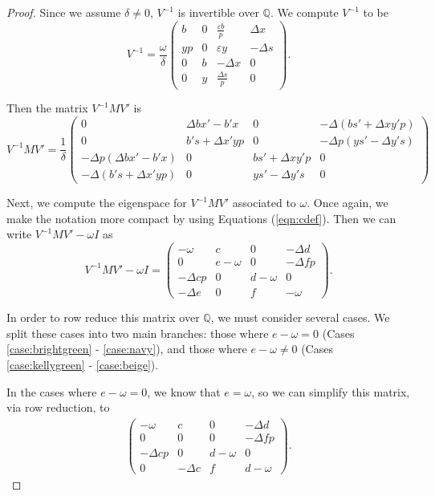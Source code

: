 \documentclass{amsart}     %
\theoremstyle{definition}
\begin{document}
\begin{proof}
Since we assume $\delta \neq 0$, $V^{-1}$ is invertible over $\mathbb{Q}$. We compute $V^{-1}$ to be 
%
\[V^{-1} =  \frac{\omega }{\delta} \begin{pmatrix} b & 0 & \frac{\varepsilon b}{p} & \Delta x\\
yp& 0 & \varepsilon y & -\Delta s\\ 0 & b & -\Delta x  & 0 \\ 
0 & y &  \frac{\Delta s}{p} & 0 \end{pmatrix}.\]

Then the matrix $V^{-1} M V' $ is 
%
\[V^{-1}M V' =  \frac{1}{\delta} \begin{pmatrix} 0 & \Delta b x' - b' x & 0 &  -\Delta( b s' + \Delta xy' p) \\
 0& b' s + \Delta x' y p & 0 & -\Delta p ( y s' - \Delta y' s)\\ 
-\Delta p( \Delta bx' -  b' x) & 0 & bs' + \Delta xy' p  & 0 \\ 
-\Delta( b's + \Delta x' y p) & 0 & ys' - \Delta y' s & 0 \end{pmatrix}\]

Next, we compute the eigenspace for $V^{-1} M V' $ associated to $\omega $. Once again, we make the notation more compact by using Equations (\ref{eqn:cdef}). Then we can write $V^{-1} M V'  - \omega  I$  as 
%
\[V^{-1}M V' - \omega  I =  \begin{pmatrix} -\omega  & c & 0 &  -\Delta d \\
 0& e - \omega  & 0 & -\Delta f p\\ 
-\Delta cp & 0 & d - \omega   & 0 \\ 
-\Delta e & 0 & f &  -\omega  \end{pmatrix}.\]

In order to row reduce this matrix over $\mathbb{Q}$, we must consider several cases. We split these cases into two main branches: those where $e - \omega  = 0$ (Cases \ref{case:brightgreen} - \ref{case:navy}), and those where $e-\omega  \neq 0$ (Cases \ref{case:kellygreen} - \ref{case:beige}). 

In the cases where $e - \omega  = 0$, we know that $e = \omega $, so we can simplify this matrix, via row reduction, to
\begin{align} \tag{A}\label{matrix:A} \begin{pmatrix} -\omega  & c & 0 &  -\Delta d \\
 0& 0 & 0 & -\Delta f p\\ 
-\Delta cp & 0 & d - \omega   & 0 \\ 
0 & -\Delta c & f &  d-\omega  \end{pmatrix}.\end{align}


\end{proof}
\end{document}
